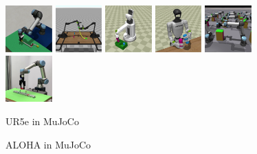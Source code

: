 \documentclass[letterpaper, 10 pt, conference]{ieeeconf}  %
\begin{document}
\begin{figure}[tb]
  \centering
  \includegraphics[width=0.16\textwidth]{figs/mujoco_ur5e.eps}
  \includegraphics[width=0.16\textwidth]{figs/mujoco_aloha.eps}
  \includegraphics[width=0.16\textwidth]{figs/mujoco_hsr.eps}
  \includegraphics[width=0.16\textwidth]{figs/mujoco_g1.eps}
  \includegraphics[width=0.16\textwidth]{figs/isaac_ur5e_parallel.eps}
  \includegraphics[width=0.16\textwidth]{figs/real_ur5e.eps}\\
  \begin{minipage}{0.16\textwidth}
    \begin{center} \footnotesize UR5e in MuJoCo \end{center}
  \end{minipage}
  \begin{minipage}{0.16\textwidth}
    \begin{center} \footnotesize ALOHA in MuJoCo \end{center}
  \end{minipage}

\end{figure}
\end{document}
